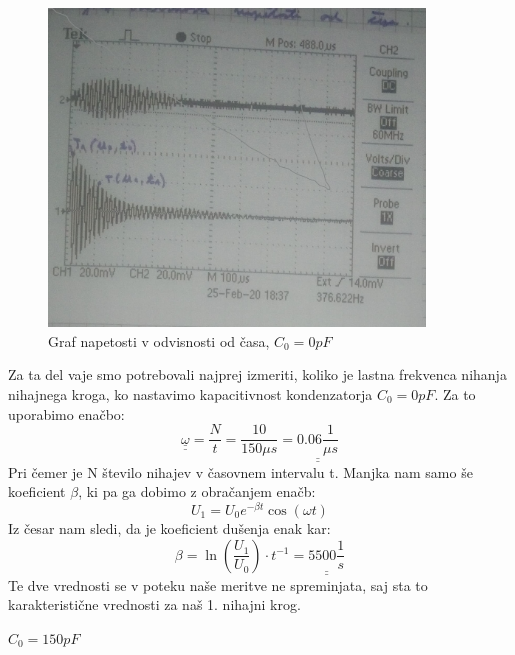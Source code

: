 \documentclass[11pt, a4paper]{article}
\theoremstyle{definition}
\theoremstyle{example}
\theoremstyle{izrek}
\begin{document}
\begin{figure}[htp]
    \centering
    \includegraphics[width=10cm]{C=0.jpg}
    \caption{Graf napetosti v odvisnosti od časa, $C_0=0 pF$}
\end{figure}
Za ta del vaje smo potrebovali najprej izmeriti, koliko je lastna frekvenca nihanja nihajnega kroga, ko nastavimo kapacitivnost kondenzatorja $C_0=0 pF$.
Za to uporabimo enačbo: $$\underline{\underline{\omega}}=\frac{N}{t}=\frac{10}{150\mu s}=\underline{\underline{0.06 \frac{1}{\mu s}}}$$
Pri čemer je N število nihajev v časovnem intervalu t. 
Manjka nam samo še koeficient $\beta$, ki pa ga dobimo z obračanjem enačb:
$$U_1=U_0e^{-\beta t}\cos(\omega t)$$
Iz česar nam sledi, da je koeficient dušenja enak kar:
$$ \beta=\ln\left(\frac{U_1}{U_0}\right)\cdot t^{-1}=\underline{\underline{5500\frac{1}{s}}}$$
Te dve vrednosti se v poteku naše meritve ne spreminjata, saj sta to karakteristične vrednosti za naš 1. nihajni krog. 

\pagebreak
\textbf{\underline{$C_0=150pF$}}\\
\end{document}
